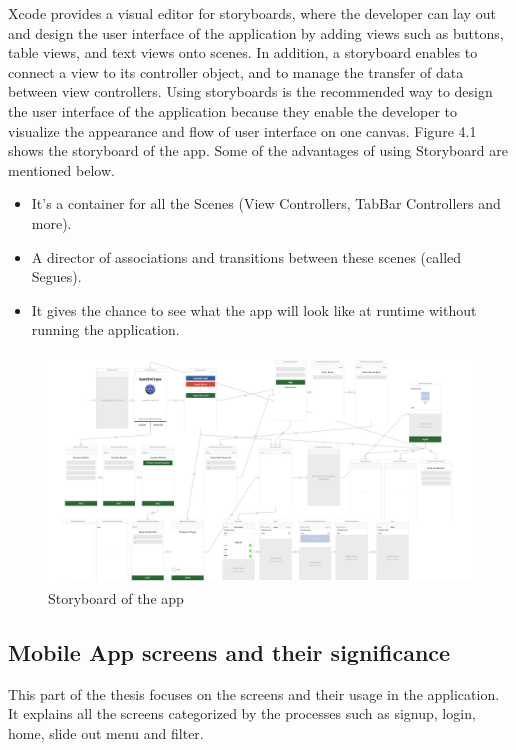 Xcode provides a visual editor for storyboards, where the developer can lay out and design the user interface of the application by adding views such as buttons, table views, and text views onto scenes. In addition, a storyboard enables to connect a view to its controller object, and to manage the transfer of data between view controllers. Using storyboards is the recommended way to design the user interface of the application because they enable the developer to visualize the appearance and flow of user interface on one canvas. Figure 4.1 shows the storyboard of the app. Some of the advantages of using Storyboard are mentioned below.

\begin{itemize}
    \item It's a container for all the Scenes (View Controllers, TabBar Controllers and more).
    \item A director of associations and transitions between these scenes (called Segues).
    \item It gives the chance to see what the app will look like at runtime without running the application.
\end{itemize}

\begin{figure}
    \centering
    \includegraphics[width=\linewidth]{figures/ch4/storyboard_final.png}
    \caption{\label{fig:storyboard_final} Storyboard of the app}
\end{figure}
    
\subsection{Mobile App screens and their significance}

This part of the thesis focuses on the screens and their usage in the application. It explains all the screens categorized by the processes such as signup, login, home, slide out menu and filter.


